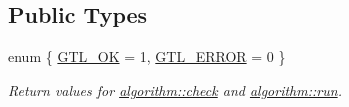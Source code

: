 \subsection*{Public Types}
\begin{DoxyCompactItemize}
\item 
enum \{ \mbox{\hyperlink{classalgorithm_af1a0078e153aa99c24f9bdf0d97f6710a5114c20e4a96a76b5de9f28bf15e282b}{G\+T\+L\+\_\+\+OK}} = 1, 
\mbox{\hyperlink{classalgorithm_af1a0078e153aa99c24f9bdf0d97f6710a6fcf574690bbd6cf710837a169510dd7}{G\+T\+L\+\_\+\+E\+R\+R\+OR}} = 0
 \}
\begin{DoxyCompactList}\small\item\em Return values for \mbox{\hyperlink{classalgorithm_a76361fb03ad1cf643affc51821e43bed}{algorithm\+::check}} and \mbox{\hyperlink{classalgorithm_a734b189509a8d6b56b65f8ff772d43ca}{algorithm\+::run}}. \end{DoxyCompactList}\end{DoxyCompactItemize}
